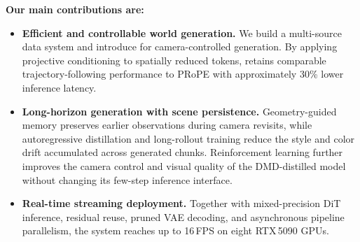 \begin{highlight}
\textbf{Our main contributions are:}
\begin{itemize}[leftmargin=*, itemsep=1pt, topsep=2pt]
    \item \textbf{Efficient and controllable world generation.}
        We build a multi-source data system and introduce \eprope{} for
        camera-controlled generation. By applying projective conditioning to
        spatially reduced tokens, \eprope{} retains comparable
        trajectory-following performance to PRoPE with approximately 30\%
        lower inference latency.
% 
    \item \textbf{Long-horizon generation with scene persistence.}
        Geometry-guided memory preserves earlier observations during camera
        revisits, while autoregressive distillation and long-rollout training
        reduce the style and color drift accumulated across generated chunks.
        Reinforcement learning further improves the camera control and visual quality
        of the DMD-distilled model without changing its few-step inference interface.
% 
    \item \textbf{Real-time streaming deployment.}
        Together with mixed-precision DiT inference, residual
        reuse, pruned VAE decoding, and asynchronous pipeline parallelism, the
        system reaches up to 16\,FPS on eight RTX\,5090 GPUs.
\end{itemize}
\end{highlight}
